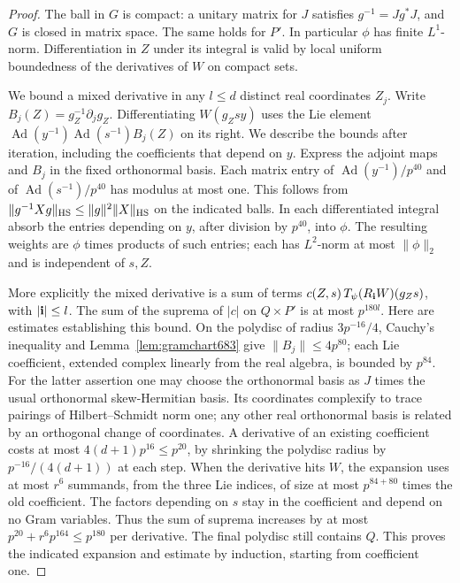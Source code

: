 \documentclass[a4paper,11pt]{article}
\theoremstyle{definition}
\theoremstyle{remark}
\numberwithin{equation}{section}
\begin{document}
\begin{proof}
The ball in \(G\) is compact: a unitary matrix for \(J\)
satisfies \(g^{-1}=Jg^*J\), and \(G\) is closed in matrix space.
The same holds for \(P'\). In particular \(\phi\) has finite
\(L^1\)-norm. Differentiation in \(Z\) under its integral is
valid by local uniform boundedness of the derivatives of \(W\)
on compact sets.

We bound a mixed derivative in any \(l\le d\) distinct real
coordinates \(Z_j\). Write \(B_j(Z)=g_Z^{-1}\partial_j g_Z\).
Differentiating \(W(g_Zs y)\) uses the Lie element
\(\operatorname{Ad}(y^{-1})\operatorname{Ad}(s^{-1})B_j(Z)\)
on its right. We describe the bounds after iteration, including
the coefficients that depend on \(y\). Express the adjoint
maps and \(B_j\) in the fixed orthonormal basis. Each matrix
entry of \(\operatorname{Ad}(y^{-1})/p^{40}\) and of
\(\operatorname{Ad}(s^{-1})/p^{40}\) has modulus at most one.
This follows from \(\|g^{-1}Xg\|_{\rm HS}\le
\|g\|^2\|X\|_{\rm HS}\) on the indicated balls. In each
differentiated integral absorb the entries depending on \(y\),
after division by \(p^{40}\), into \(\phi\). The resulting
weights are \(\phi\) times products of such entries; each has
\(L^2\)-norm at most \(\|\phi\|_2\) and is independent of \(s,Z\).

More explicitly the mixed derivative is a sum of terms
\(c(Z,s)\,T_\psi(R_{\bf i}W)(g_Zs)\), with \(|{\bf i}|\le l\).
The sum of the suprema of \(|c|\) on \(Q\times P'\) is at
most \(p^{180l}\). Here are estimates establishing this bound.
On the polydisc of radius \(3p^{-16}/4\), Cauchy's inequality
and Lemma~\ref{lem:gramchart683} give
\(\|B_j\|\le4p^{80}\); each Lie coefficient, extended
complex linearly from the real algebra, is bounded by \(p^{84}\).
For the latter assertion one may choose the orthonormal basis
as \(J\) times the usual orthonormal skew-Hermitian basis.
Its coordinates complexify to trace pairings of Hilbert--Schmidt
norm one; any other real orthonormal basis is related by an
orthogonal change of coordinates. A derivative of an existing
coefficient costs at most \(4(d+1)p^{16}\le p^{20}\), by shrinking
the polydisc radius by \(p^{-16}/(4(d+1))\) at each step.
When the derivative hits \(W\), the expansion uses at most
\(r^6\) summands, from the three Lie indices, of size at most
\(p^{84+80}\) times the old coefficient. The factors depending
on \(s\) stay in the coefficient and depend on no Gram variables.
Thus the sum of suprema increases by at most
\(p^{20}+r^6 p^{164}\le p^{180}\) per derivative. The final
polydisc still contains \(Q\). This proves the indicated expansion
and estimate by induction, starting from coefficient one.


\end{proof}
\end{document}
